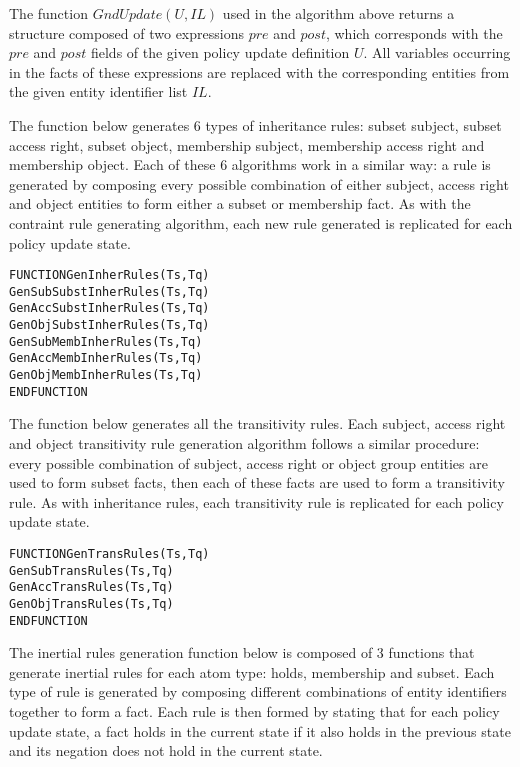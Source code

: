 \documentclass[global,twocolumn,final]{svjour}
\newenvironment{vverbatim}
  {\begin{alltt}}
  {\vspace{-\baselineskip}\end{alltt}}
\begin{document}
          The function $GndUpdate(U, IL)$ used in the algorithm above returns
          a structure composed of two expressions $pre$ and $post$, which
          corresponds with the $pre$ and $post$ fields of the given policy
          update definition $U$. All variables occurring in the facts of these
          expressions are replaced with the corresponding entities from the
          given entity identifier list $IL$.

          The function below generates 6 types of inheritance rules: subset
          subject, subset access right, subset object, membership subject,
          membership access right and membership object. Each of these 6
          algorithms work in a similar way: a rule is generated by composing
          every possible combination of either subject, access right and object
          entities to form either a subset or membership fact. As with the
          contraint rule generating algorithm, each new rule generated is
          replicated for each policy update state.

          \begin{vverbatim}
FUNCTION GenInherRules(Ts, Tq)
  GenSubSubstInherRules(Ts, Tq)
  GenAccSubstInherRules(Ts, Tq)
  GenObjSubstInherRules(Ts, Tq)
  GenSubMembInherRules(Ts, Tq)
  GenAccMembInherRules(Ts, Tq)
  GenObjMembInherRules(Ts, Tq)
ENDFUNCTION
          \end{vverbatim}

          The function below generates all the transitivity rules. Each
          subject, access right and object transitivity rule generation
          algorithm follows a similar procedure: every possible combination of
          subject, access right or object group entities are used to form
          subset facts, then each of these facts are used to form a
          transitivity rule. As with inheritance rules, each transitivity rule
          is replicated for each policy update state.

          \begin{vverbatim}
FUNCTION GenTransRules(Ts, Tq)
  GenSubTransRules(Ts, Tq)
  GenAccTransRules(Ts, Tq)
  GenObjTransRules(Ts, Tq)
ENDFUNCTION
          \end{vverbatim}

          The inertial rules generation function below is composed of 3
          functions that generate inertial rules for each atom type: holds,
          membership and subset. Each type of rule is generated by composing
          different combinations of entity identifiers together to form a fact.
          Each rule is then formed by stating that for each policy update
          state, a fact holds in the current state if it also holds in the
          previous state and its negation does not hold in the current state.
\end{document}
